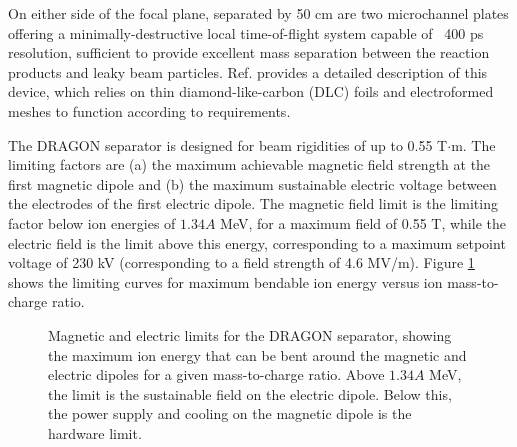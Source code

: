 On either side of the focal plane, separated by 50 cm are two microchannel plates offering a minimally-destructive local time-of-flight system capable of ~400 ps resolution, sufficient to provide excellent mass separation between the reaction products and leaky beam particles. Ref. \cite{vock09} provides a detailed description of this device, which relies on thin diamond-like-carbon (DLC) foils and electroformed meshes to function according to requirements. 

The DRAGON separator is designed for beam rigidities of up to 0.55 T$\cdot$m. The limiting factors are (a) the maximum achievable magnetic field strength at the first magnetic dipole and (b) the maximum sustainable electric voltage between the electrodes of the first electric dipole. The magnetic field limit is the limiting factor below ion energies of $1.34A$ MeV, for a maximum field of 0.55 T, while the electric field is the limit above this energy, corresponding to a maximum setpoint voltage of 230 kV (corresponding to a field strength of 4.6 MV/m). Figure \ref{fig:rigidity} shows the limiting curves for maximum bendable ion energy versus ion mass-to-charge ratio.   

\begin{figure}
\caption{Magnetic and electric limits for the DRAGON separator, showing the maximum ion energy that can be bent around the magnetic and electric dipoles for a given mass-to-charge ratio. Above $1.34A$ MeV, the limit is the sustainable field on the electric dipole. Below this, the power supply and cooling on the magnetic dipole is the hardware limit.}
\label{fig:rigidity}
\end{figure}

